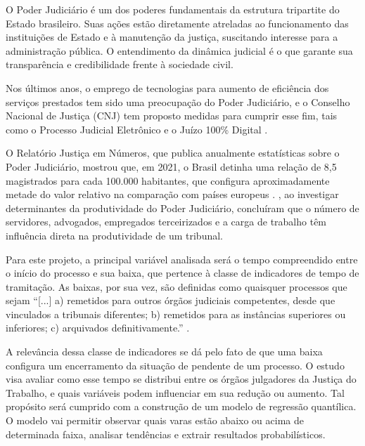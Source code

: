 O Poder Judiciário é um dos poderes fundamentais da estrutura tripartite do Estado brasileiro. Suas ações estão diretamente atreladas ao funcionamento das instituições de Estado e à manutenção da justiça, suscitando interesse para a administração pública. O entendimento da dinâmica judicial é o que garante sua transparência e credibilidade frente à sociedade civil.

Nos últimos anos, o emprego de tecnologias para aumento de eficiência dos serviços prestados tem sido uma preocupação do Poder Judiciário, e o Conselho Nacional de Justiça (CNJ) tem proposto medidas para cumprir esse fim, tais como o Processo Judicial Eletrônico \cite{pje} e o Juízo 100\% Digital \cite{juizo100digital}.

O Relatório Justiça em Números, que publica anualmente estatísticas sobre o Poder Judiciário, mostrou que, em 2021, o Brasil detinha uma relação de 8,5 magistrados para cada 100.000 habitantes, que configura aproximadamente metade do valor relativo na comparação com países europeus \cite{justicaemnumeros}. , ao investigar determinantes da produtividade do Poder Judiciário, concluíram que o número de servidores, advogados, empregados terceirizados e a carga de trabalho têm influência direta na produtividade de um tribunal.

Para este projeto, a principal variável analisada será o tempo compreendido entre o início do processo e sua baixa, que pertence à classe de indicadores de tempo de tramitação. As baixas, por sua vez, são definidas como quaisquer processos que sejam “[...] a) remetidos para outros órgãos judiciais competentes, desde que vinculados a tribunais diferentes; b) remetidos para as instâncias superiores ou inferiores; c) arquivados definitivamente.” \cite{painelestatistica}.

A relevância dessa classe de indicadores se dá pelo fato de que uma baixa configura um encerramento da situação de pendente de um processo. O estudo visa avaliar como esse tempo se distribui entre os órgãos julgadores da Justiça do Trabalho, e quais variáveis podem influenciar em sua redução ou aumento. Tal propósito será cumprido com a construção de um modelo de regressão quantílica. O modelo vai permitir observar quais varas estão abaixo ou acima de determinada faixa, analisar tendências e extrair resultados probabilísticos.




